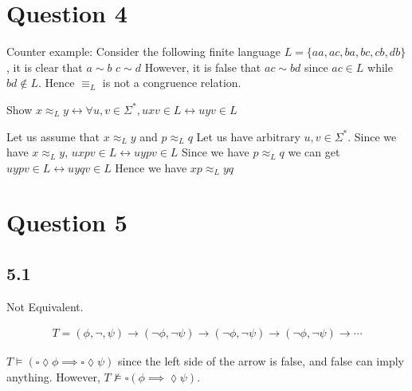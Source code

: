 \documentclass[a4paper, 11pt]{article}
\begin{document}



\section*{Question 4}
Counter example: Consider the following finite language $L=\{aa,ac,ba,bc,cb,db\}$, it is clear that $a \sim b$ $c \sim d$ However, it is false that $ac \sim bd$ since $ac \in L$ while $bd \notin L$. Hence $\equiv_L$ is not a congruence relation.

Show  $x \approx_L y \leftrightarrow \forall u,v \in \Sigma^*, uxv \in L  \leftrightarrow uyv \in L$

Let us assume that $x \approx_L y$ and $p \approx_L q$ Let us have arbitrary $u,v \in \Sigma^*$. Since we have $x\approx_L y$, $uxpv \in L \leftrightarrow uypv \in L$ Since we have $p \approx_L q$ we can get $uypv \in L \leftrightarrow uyqv \in L$ Hence we have $xp \approx_L yq$

\section*{Question 5}
\subsection*{5.1}
Not Equivalent.

\begin{align*}
     T=(\phi,\lnot,\psi) \rightarrow (\lnot\phi,\lnot \psi)\rightarrow (\lnot\phi,\lnot \psi)\rightarrow (\lnot\phi,\lnot \psi)\rightarrow\cdots
\end{align*}

$T\models (\square\lozenge\phi \implies \square\lozenge\psi)$ since the left side of the arrow is false, and false can imply anything.
  However, $T \not\models \square(\phi \implies \lozenge \psi)$.
  
\end{document}
